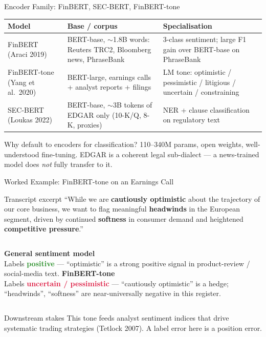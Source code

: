 \documentclass[9pt,t]{beamer}
\begin{document}
\begin{frame}{Encoder Family: FinBERT, SEC-BERT, FinBERT-tone}
\small
\begin{tabular}{p{}p{}p{}}
\toprule
\textbf{Model} & \textbf{Base / corpus} & \textbf{Specialisation} \\
\midrule
FinBERT (Araci 2019) & BERT-base, $\sim$1.8B words: Reuters TRC2, Bloomberg news, PhraseBank & 3-class sentiment; large F1 gain over BERT-base on PhraseBank \\[3pt]
FinBERT-tone (Yang et al.\ 2020) & BERT-large, earnings calls + analyst reports + filings & LM tone: optimistic / pessimistic / litigious / uncertain / constraining \\[3pt]
SEC-BERT (Loukas 2022) & BERT-base, $\sim$3B tokens of EDGAR only (10-K/Q, 8-K, proxies) & NER + clause classification on regulatory text \\
\bottomrule
\end{tabular}

\medskip
\begin{block}{Why default to encoders for classification?}
110--340M params, open weights, well-understood fine-tuning. EDGAR is a coherent
legal sub-dialect --- a news-trained model does \emph{not} fully transfer to it.
\end{block}
\end{frame}

\begin{frame}{Worked Example: FinBERT-tone on an Earnings Call}
\begin{exampleblock}{Transcript excerpt}
``While we are \textbf{cautiously optimistic} about the trajectory of our core
business, we want to flag meaningful \textbf{headwinds} in the European segment,
driven by continued \textbf{softness} in consumer demand and heightened
\textbf{competitive pressure}.''
\end{exampleblock}

\medskip
\begin{columns}[T]
\textbf{General sentiment model}\\
Labels \textcolor{forestgreen}{\textbf{positive}} --- ``optimistic'' is a strong
positive signal in product-review / social-media text.
\textbf{FinBERT-tone}\\
Labels \textcolor{crimson}{\textbf{uncertain / pessimistic}} --- ``cautiously
optimistic'' is a hedge; ``headwinds'', ``softness'' are near-universally negative
in this register.
\end{columns}

\medskip
\begin{alertblock}{Downstream stakes}
This tone feeds analyst sentiment indices that drive systematic trading strategies
(Tetlock 2007). A label error here is a position error.
\end{alertblock}
\end{frame}
\end{document}
